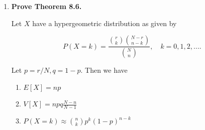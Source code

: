 \documentclass[10pt, oneside]{article}
\begin{document}
\begin{enumerate}[label=8.\arabic*]
\begin{proof}
\begin{align*}
P(X > t) &= \sum^{\infty}_{i = t+1} P(X = i) \\
&= \sum^{\infty}_{i = t+1} (1-p)^{i-1} p \\
&= 1 - \sum^t_{i=1} (1-p)^{i-1} p \\
&= 1 - p \Bigg( \frac{1 - (1-p)^t}{1 - (1-p)} \Bigg) \\
&= (1-p)^t
\end{align*}

And similarly for the left:

\begin{align*}
P(X > s + t | X > s) &= \frac{P(X > s + t, X > s)}{P(X > s)} \\
&= \frac{P(X > s + t)}{P(X > s)} \\
&= \frac{\sum^{\infty}_{i = s + t + 1} (1-p)^{i-1} p }{\sum^{\infty}_{i = s + 1} (1-p)^{i-1} p} \\
&= \frac{ 1 - \sum^{s+t}_{i = 1} (1-p)^{i-1} p}{ 1- \sum^s_{i = 1} (1-p)^{i-1} p } \\
&= \frac{1 - p \Big( \frac{1 - (1-p)^{s+t}}{1 - (1-p)} \Big) }{ 1 - p \Big( \frac{1-(1-p)^s}{1-(1-p)} \Big)} \\
&= \frac{(1-p)^{s+t}}{(1-p)^s} = (1-p)^t
\end{align*}

And so we can conclude that $\boxed{ P(X > s + t | X > s) = P(X > t) }$.
\end{proof}

\item  \begin{tcolorbox}[
  colback=Cerulean!5!white,
  colframe=Cerulean!75!black]
\textbf{Prove Theorem 8.6.}
\end{tcolorbox}

\begin{thm*}
Let $X$ have a hypergeometric distribution as given by

\[ P(X = k) = \frac{\binom{r}{k} \binom{N-r}{n-k} }{\binom{N}{n} }, \quad k = 0, 1, 2, .... \]

Let $p = r/N, q = 1 - p$. Then we have

\begin{enumerate}
\item $E[X] = np$
\item $V[X] = npq \frac{N-n}{N-1}$
\item $P(X = k) \approx \binom{n}{k} p^k (1-p)^{n-k}$
\end{enumerate}
\end{thm*}


\end{enumerate}
\end{document}

